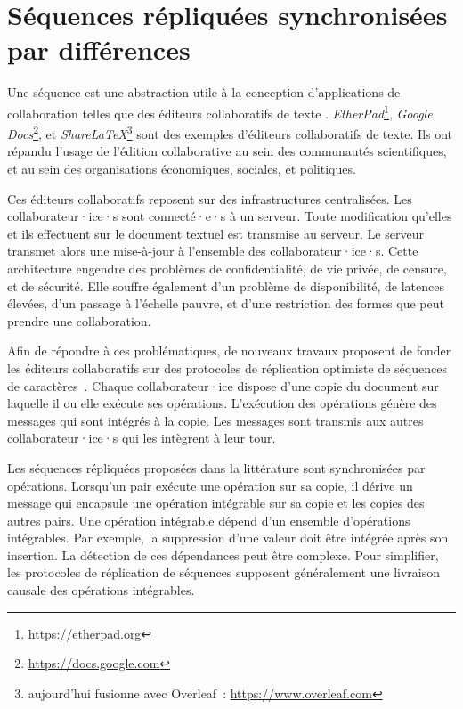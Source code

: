 
\chapter{Séquences répliquées synchronisées par différences}\label{ch:dotted-logootsplit}

\minitoc{}
\bigskip

Une séquence est une abstraction utile à la conception d'applications de collaboration telles que des éditeurs collaboratifs de texte \autocite{2017_nicolas-mute-demo,nedelec2016_crate}.
\emph{EtherPad}\footnote{\url{https://etherpad.org}}, \emph{Google Docs}\footnote{\url{https://docs.google.com}}, et \emph{ShareLaTeX}\footnote{aujourd'hui fusionne avec Overleaf~: \url{https://www.overleaf.com}} sont des exemples d'éditeurs collaboratifs de texte.
Ils ont répandu l'usage de l'édition collaborative au sein des communautés scientifiques, et au sein des organisations économiques, sociales, et politiques.

Ces éditeurs collaboratifs reposent sur des infrastructures centralisées.
Les collaborateur·ice·s sont connecté·e·s à un serveur.
Toute modification qu'elles et ils effectuent sur le document textuel est transmise au serveur.
Le serveur transmet alors une mise-à-jour à l'ensemble des collaborateur·ice·s.
Cette architecture engendre des problèmes de confidentialité, de vie privée, de censure, et de sécurité.
Elle souffre également d'un problème de disponibilité, de latences élevées, d'un passage à l'échelle pauvre, et d'une restriction des formes que peut prendre une collaboration.

Afin de répondre à ces problématiques, de nouveaux travaux proposent de fonder les éditeurs collaboratifs sur des protocoles de réplication optimiste de séquences de caractères~\autocite{oster_2006_woot,weiss_2009_logoot,preguica_2009_treedoc,roh_2011_rga}.
Chaque collaborateur·ice dispose d'une copie du document sur laquelle il ou elle exécute ses opérations.
L'exécution des opérations génère des messages qui sont intégrés à la copie.
Les messages sont transmis aux autres collaborateur·ice·s qui les intègrent à leur tour.

Les séquences répliquées proposées dans la littérature sont synchronisées par opérations.
Lorsqu'un pair exécute une opération sur sa copie, il dérive un message qui encapsule une opération intégrable sur sa copie et les copies des autres pairs.
Une opération intégrable dépend d'un ensemble d'opérations intégrables.
Par exemple, la suppression d'une valeur doit être intégrée après son insertion.
La détection de ces dépendances peut être complexe.
Pour simplifier, les protocoles de réplication de séquences supposent généralement une livraison causale des opérations intégrables.

